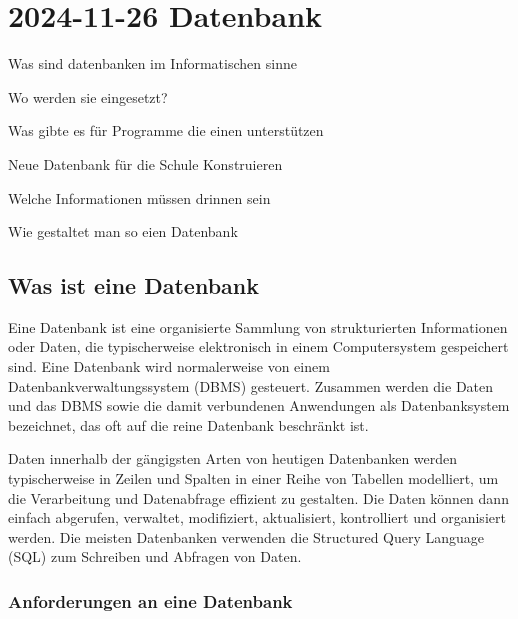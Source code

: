 \section{2024-11-26 Datenbank}

\startitemize[packed]
\item Was sind datenbanken im Informatischen sinne
\item Wo werden sie eingesetzt?
\item Was gibte es für Programme die einen unterstützen
\item Neue Datenbank für die Schule Konstruieren
\startitemize[packed]
\item Welche Informationen müssen drinnen sein
\item Wie gestaltet man so eien Datenbank
\stopitemize
\stopitemize

\subsection{Was ist eine Datenbank}

\startdefinition[title={Datenbank\sidenote{\cite[entry][database:oracle:what-is-database]}}]
Eine Datenbank ist eine organisierte Sammlung von strukturierten Informationen oder Daten, die typischerweise elektronisch in einem Computersystem gespeichert sind. Eine Datenbank wird normalerweise von einem Datenbankverwaltungssystem (DBMS) gesteuert. Zusammen werden die Daten und das DBMS sowie die damit verbundenen Anwendungen als Datenbanksystem bezeichnet, das oft auf die reine Datenbank beschränkt ist.

\blank

Daten innerhalb der gängigsten Arten von heutigen Datenbanken werden typischerweise in Zeilen und Spalten in einer Reihe von Tabellen modelliert, um die Verarbeitung und Datenabfrage effizient zu gestalten. Die Daten können dann einfach abgerufen, verwaltet, modifiziert, aktualisiert, kontrolliert und organisiert werden. Die meisten Datenbanken verwenden die Structured Query Language (SQL) zum Schreiben und Abfragen von Daten.
\stopdefinition

\subsubsection{Anforderungen an eine Datenbank}

\startplacetable[location={split},title={Thenem}]

